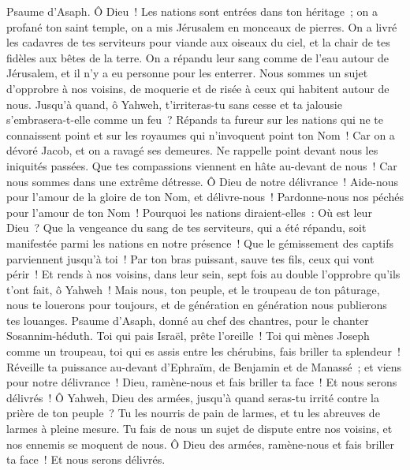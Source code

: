 \begin{multicols}{2}
\VerseOne{}Psaume d'Asaph. Ô Dieu~! Les nations sont entrées dans ton héritage~; on a profané ton saint temple, on a mis Jérusalem en monceaux de pierres.
On a livré les cadavres de tes serviteurs pour viande aux oiseaux du ciel, et la chair de tes fidèles aux bêtes de la terre.
On a répandu leur sang comme de l'eau autour de Jérusalem, et il n'y a eu personne pour les enterrer.
Nous sommes un sujet d'opprobre à nos voisins, de moquerie et de risée à ceux qui habitent autour de nous.
Jusqu'à quand, ô Yahweh, t'irriteras-tu sans cesse et ta jalousie s'embrasera-t-elle comme un feu~?
Répands ta fureur sur les nations qui ne te connaissent point et sur les royaumes qui n'invoquent point ton Nom~!
Car on a dévoré Jacob, et on a ravagé ses demeures.
Ne rappelle point devant nous les iniquités passées. Que tes compassions viennent en hâte au-devant de nous~! Car nous sommes dans une extrême détresse.
Ô Dieu de notre délivrance~! Aide-nous pour l'amour de la gloire de ton Nom, et délivre-nous~! Pardonne-nous nos péchés pour l'amour de ton Nom~!
Pourquoi les nations diraient-elles~: Où est leur Dieu~? Que la vengeance du sang de tes serviteurs, qui a été répandu, soit manifestée parmi les nations en notre présence~!
Que le gémissement des captifs parviennent jusqu'à toi~! Par ton bras puissant, sauve tes fils, ceux qui vont périr~!
Et rends à nos voisins, dans leur sein, sept fois au double l'opprobre qu'ils t'ont fait, ô Yahweh~!
Mais nous, ton peuple, et le troupeau de ton pâturage, nous te louerons pour toujours, et de génération en génération nous publierons tes louanges.
\VerseOne{}Psaume d'Asaph, donné au chef des chantres, pour le chanter Sosannim-héduth.
Toi qui pais Israël, prête l'oreille~! Toi qui mènes Joseph comme un troupeau, toi qui es assis entre les chérubins, fais briller ta splendeur~!
Réveille ta puissance au-devant d'Ephraïm, de Benjamin et de Manassé~; et viens pour notre délivrance~!
Dieu, ramène-nous et fais briller ta face~! Et nous serons délivrés~!
Ô Yahweh, Dieu des armées, jusqu'à quand seras-tu irrité contre la prière de ton peuple~?
Tu les nourris de pain de larmes, et tu les abreuves de larmes à pleine mesure.
Tu fais de nous un sujet de dispute entre nos voisins, et nos ennemis se moquent de nous.
Ô Dieu des armées, ramène-nous et fais briller ta face~! Et nous serons délivrés.

\end{multicols}
